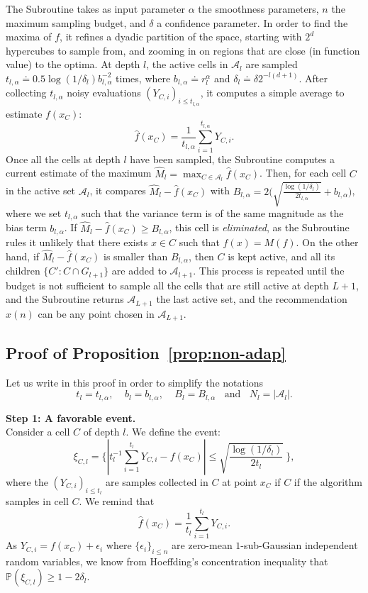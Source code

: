 \documentclass[final,12pt]{colt2018}
\begin{document}
The Subroutine takes as input parameter $\alpha$ the smoothness parameters, $n$ the maximum sampling budget, and $\delta$ a confidence parameter. In order to find the maxima of $f$, it refines a dyadic partition of the space, starting with $2^{d}$ hypercubes to sample from, and zooming in on regions that are close (in function value) to the optima. At depth $l$, the active cells in $\mathcal{A}_l$ are sampled $t_{l,\alpha} \doteq 0.5\log(1/\delta_l)b_{l,\alpha}^{-2}$ times, where $b_{l,\alpha} \doteq r_l^{\alpha}$ and $\delta_l \doteq \delta 2^{-l(d+1)}$. After collecting $t_{l,\alpha}$ noisy evaluations $(Y_{C,i})_{i \leq t_{l,\alpha}}$, it computes a simple average to estimate $f(x_C)$:
$$
\widehat{f}(x_C) = \frac{1}{t_{l,\alpha}}\sum_{i=1}^{t_{l,\alpha}}Y_{C,i}.
$$
Once all the cells at depth $l$ have been sampled, the Subroutine computes a current estimate of the maximum $\widehat{M}_l = \max_{C \in \mathcal A_l} \widehat{f}(x_C)$. Then, for each cell $C$ in the active set $\mathcal A_l$, it compares $\widehat{M}_l -\widehat{f}(x_C)$ with $B_{l,\alpha} = 2 \big(\sqrt{\frac{\log(1/\delta_l)}{2 t_{l,\alpha}}} +b_{l,\alpha}\big)$, where we set $t_{l,\alpha}$ such that the variance term is of the same magnitude as the bias term $b_{l,\alpha}$. If $\widehat{M}_l -\widehat{f}(x_C) \geq B_{l,\alpha}$, this cell is \textit{eliminated}, as the Subroutine rules it unlikely that there exists $x \in C$ such that $f(x) = M(f)$. On the other hand, if $\widehat{M}_l - \widehat{f}(x_C)$ is smaller than $B_{l,\alpha}$, then $C$ is kept active, and all its children $\{C': C \cap G_{l+1}\}$ are added to $\mathcal A_{l+1}$. This process is repeated until the budget is not sufficient to sample all the cells that are still active at depth $L+1$, and the Subroutine returns $\mathcal{A}_{L+1}$ the last active set, and the recommendation $x(n)$ can be any point chosen in $\mathcal{A}_{L+1}$.

\subsection{Proof of Proposition~\ref{prop:non-adap}} \label{proof_non_adap}
Let us write in this proof in order to simplify the notations
$$t_{l} = t_{l,\alpha},~~~~~b_{l} = b_{l,\alpha},~~~~~B_l = B_{l,\alpha}~~~~\text{and}~~~~N_l = |\mathcal A_l|.$$

\textbf{Step 1: A favorable event.}\\
Consider a cell  $C$ of depth $l$. We define the event:
$$
\xi_{C,l} = \Big\{ |t_l^{-1}\sum_{i=1}^{t_l} Y_{C,i} - f(x_C)| \leq \sqrt{\frac{\log(1/\delta_l)}{2t_l}} \ \Big\},
$$
where the $(Y_{C,i})_{i\leq t_l}$ are samples collected in $C$ at point $x_C$ if $C$ if the algorithm samples in cell $C$. We remind that
$$\widehat{f}(x_C) =\frac{1}{t_l}\sum_{i=1}^{t_l} Y_{C,i}.$$
As $Y_{C,i} = f(x_C) + \epsilon_i$ where $\{\epsilon_i\}_{i \leq n}$ are zero-mean $1$-sub-Gaussian independent random variables, we know from Hoeffding's concentration inequality that $\mathbb{P}(\xi_{C,l}) \geq 1-2\delta_l$.\\ 
\end{document}
